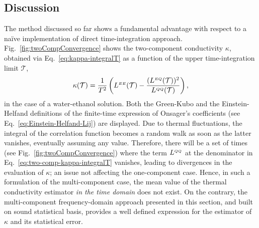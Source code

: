 \subsection{Discussion}
The method discussed so far shows a fundamental advantage with respect to a na\"ive implementation of direct time-integration approach.
Fig.~\ref{fig:twoCompConvergence} shows the two-component conductivity $\kappa$, obtained via Eq.~\eqref{eq:kappa-integralT} as a function of the upper time-integration limit $\mathcal{T}$, 
\begin{equation}
    \kappa(\mathcal{T}) = \frac{1}{T^2} \left( L^{\smallE\smallE}(\mathcal{T}) - \frac{(L^{\smallE\smallQ}(\mathcal{T}))^2}{L^{\smallQ\smallQ}(\mathcal{T})} \right),  \label{eq:two-comp-kappa-integralT}
\end{equation}
in the case of a water-ethanol solution. Both the Green-Kubo and the Einstein-Helfand definitions of the finite-time expression of Onsager's coefficients (see Eq.~\eqref{eq:Einstein-Helfand-Lij}) are displayed.
Due to thermal fluctuations, the integral of the correlation function becomes a random walk as soon as the latter vanishes, eventually assuming any value. Therefore, there will be a set of times (see Fig.~\ref{fig:twoCompConvergence}) where the term $L^{{\scriptscriptstyle Q}{\scriptscriptstyle Q}}$ at the denominator in Eq.~\eqref{eq:two-comp-kappa-integralT} vanishes, leading to divergences in the evaluation of $\kappa$; an issue not affecting the one-component case. Hence, in such a formulation of the multi-component case, the mean value of the thermal conductivity estimator \textit{in the time domain} does not exist. On the contrary, the multi-component frequency-domain approach presented in this section, and built on sound statistical basis, provides a well defined expression for the estimator of $\kappa$ and its statistical error.


